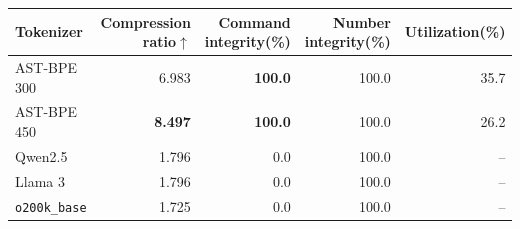 \begin{tabular*}{\linewidth}{@{\extracolsep{\fill}}lrrrr@{}}\toprule
Tokenizer & Compression ratio$\uparrow$ & Command integrity(\%) & Number integrity(\%) & Utilization(\%)\\\midrule
AST-BPE 300 & 6.983 & \textbf{100.0} & 100.0 & 35.7\\
AST-BPE 450 & \textbf{8.497} & \textbf{100.0} & 100.0 & 26.2\\
Qwen2.5 & 1.796 & 0.0 & 100.0 & --\\
Llama 3 & 1.796 & 0.0 & 100.0 & --\\
\texttt{o200k\_base} & 1.725 & 0.0 & 100.0 & --\\
\bottomrule\end{tabular*}